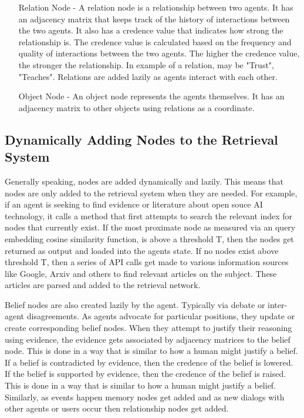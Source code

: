 \begin{itemize}
    \item[Relation Node] - A relation node is a relationship between two agents. It has an adjacency matrix that keeps track of the history of interactions between the two agents. It also has a credence value that indicates how strong the relationship is. The credence value is calculated based on the frequency and quality of interactions between the two agents. The higher the credence value, the stronger the relationship. In example of a relation, may be "Trust", "Teaches". Relations are added lazily as agents interact with each other.
    \item[Object Node] - An object node represents the agents themselves. It has an adjacency matrix to other objects using relations as a coordinate.
\end{itemize}

\subsection{Dynamically Adding Nodes to the Retrieval System}

Generally speaking, nodes are added dynamically and lazily. This means that nodes are only added to the retrieval system when they are needed. For example, if an agent is seeking to find evidence or literature about open souce AI technology, it calls a method that first attempts to search the relevant index for nodes that currently exist. If the most proximate node as measured via an query embedding cosine similarity function, is above a threshold T, then the nodes get returned as output and loaded into the agents state. If no nodes exist above threshold T, then a series of API calls get made to various information sources like Google, Arxiv and others to find relevant articles on the subject. These articles are parsed and added to the retrieval network.

Belief nodes are also created lazily by the agent. Typically via debate or inter-agent disagreements. As agents advocate for particular positions, they update or create corresponding belief nodes. When they attempt to justify their reasoning using evidence, the evidence gets associated by adjacency matrices to the belief node. This is done in a way that is similar to how a human might justify a belief. If a belief is contradicted by evidence, then the credence of the belief is lowered. If the belief is supported by evidence, then the credence of the belief is raised. This is done in a way that is similar to how a human might justify a belief. Similarly, as events happen memory nodes get added and as new dialogs with other agents or users occur then relationship nodes get added.


